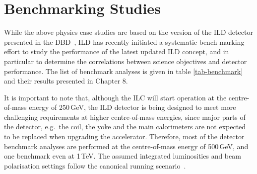 %

\section{Benchmarking Studies}
While the above physics case studies are based on the version of the ILD detector presented in the DBD~\cite{ild:bib:ilddbd}, ILD has recently initiated a systematic bench-marking effort to study the performance of the latest updated ILD concept, and in particular to determine the correlations between science objectives and detector performance. The list of benchmark analyses is given in table \ref{tab-benchmark} and their results presented in Chapter 8. 

It is important to note that, although the ILC will start operation at the centre-of-mass energy of 250\,GeV, the ILD detector is being designed to meet more challenging requirements at higher centre-of-mass energies, since major parts of the detector, e.g.\ the coil, the yoke and the main calorimeters are not expected to be replaced when upgrading the accelerator. Therefore, most of the detector benchmark analyses are performed at the centre-of-mass energy of 500\,GeV, and one benchmark even at 1\,TeV. The assumed integrated luminosities and beam polarisation settings follow the canonical running scenario~\cite{Barklow:2015tja}.

